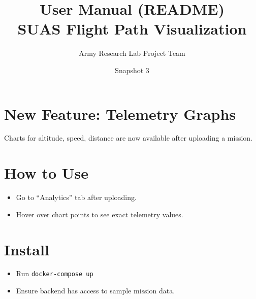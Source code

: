 \documentclass[12pt]{article}
\title{User Manual (README)\\SUAS Flight Path Visualization}
\author{Army Research Lab Project Team}
\date{Snapshot 3}
\begin{document}
\maketitle

\section{New Feature: Telemetry Graphs}
Charts for altitude, speed, distance are now available after uploading a mission.

\section{How to Use}
\begin{itemize}
  \item Go to “Analytics” tab after uploading.
  \item Hover over chart points to see exact telemetry values.
\end{itemize}

\section{Install}
\begin{itemize}
  \item Run \texttt{docker-compose up}
  \item Ensure backend has access to sample mission data.
\end{itemize}
\end{document}
